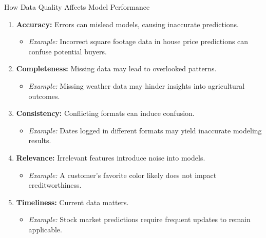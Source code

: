 \documentclass[aspectratio=169]{beamer}
\begin{document}
\begin{frame}[fragile]{How Data Quality Affects Model Performance}
    \begin{enumerate}
        \item \textbf{Accuracy:} Errors can mislead models, causing inaccurate predictions. 
        \begin{itemize}
            \item \textit{Example:} Incorrect square footage data in house price predictions can confuse potential buyers.
        \end{itemize}
        
        \item \textbf{Completeness:} Missing data may lead to overlooked patterns.
        \begin{itemize}
            \item \textit{Example:} Missing weather data may hinder insights into agricultural outcomes.
        \end{itemize}
        
        \item \textbf{Consistency:} Conflicting formats can induce confusion.
        \begin{itemize}
            \item \textit{Example:} Dates logged in different formats may yield inaccurate modeling results.
        \end{itemize}
        
        \item \textbf{Relevance:} Irrelevant features introduce noise into models.
        \begin{itemize}
            \item \textit{Example:} A customer's favorite color likely does not impact creditworthiness.
        \end{itemize}
        
        \item \textbf{Timeliness:} Current data matters.
        \begin{itemize}
            \item \textit{Example:} Stock market predictions require frequent updates to remain applicable.
        \end{itemize}
    \end{enumerate}
\end{frame}
\end{document}
